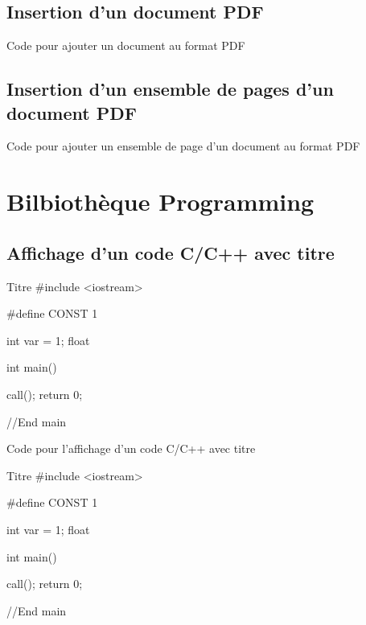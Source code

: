 \documentclass[12pt]{report}
\begin{document}
\section{Insertion d'un document PDF}

\begin{Latex}{Code pour ajouter un document au format PDF}
    
\end{Latex}

\section{Insertion d'un ensemble de pages d'un document PDF}

\begin{Latex}{Code pour ajouter un ensemble de page d'un document au format PDF}
    
\end{Latex}\chapter{Bilbiothèque Programming}


\section{Affichage d'un code C/C++ avec titre}


\begin{Cpp}{Titre}
#include <iostream>

#define CONST 1

int var = 1;
float 

int main() {
  
  call();
  return 0;

}//End main

\end{Cpp}

\begin{Latex}{Code pour l'affichage d'un code C/C++ avec titre}
    \begin{Cpp}{Titre}
        #include <iostream>
        
        #define CONST 1
        
        int var = 1;
        float 
        
        int main() {
          
          call();
          return 0;
        
        }//End main
        
        \end{Cpp}
\end{Latex}
\end{document}
